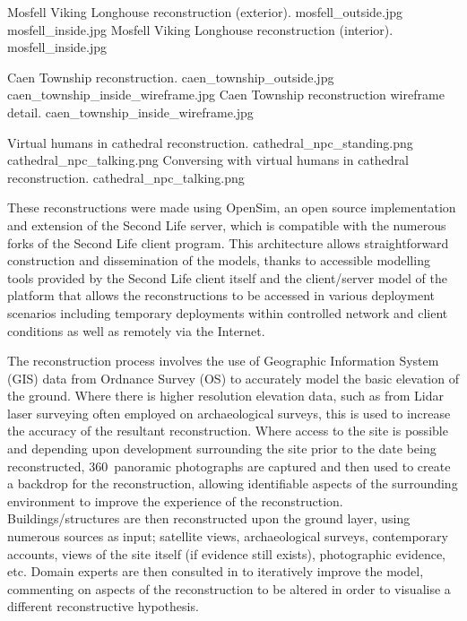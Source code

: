  {Mosfell Viking Longhouse reconstruction (exterior).} {mosfell_outside.jpg}
	   {mosfell_inside.jpg} {Mosfell Viking Longhouse reconstruction (interior).} {mosfell_inside.jpg}

 {Caen Township reconstruction.} {caen_township_outside.jpg}
       {caen_township_inside_wireframe.jpg} {Caen Township reconstruction wireframe detail.} {caen_township_inside_wireframe.jpg}

 {Virtual humans in cathedral reconstruction.} {cathedral_npc_standing.png}
       {cathedral_npc_talking.png} {Conversing with virtual humans in cathedral reconstruction.} {cathedral_npc_talking.png}

These reconstructions were made using OpenSim, an open source implementation and extension of the Second Life server, which is compatible with the numerous forks of the Second Life client program. This architecture allows straightforward construction and dissemination of the models, thanks to accessible modelling tools provided by the Second Life client itself and the client/server model of the platform that allows the reconstructions to be accessed in various deployment scenarios including temporary deployments within controlled network and client conditions as well as remotely via the Internet.

The reconstruction process involves the use of Geographic Information System (GIS) data from Ordnance Survey (OS) to accurately model the basic elevation of the ground. Where there is higher resolution elevation data, such as from Lidar laser surveying often employed on archaeological surveys, this is used to increase the accuracy of the resultant reconstruction. Where access to the site is possible and depending upon development surrounding the site prior to the date being reconstructed, 360\textdegree\ panoramic photographs are captured and then used to create a backdrop for the reconstruction, allowing identifiable aspects of the surrounding environment to improve the experience of the reconstruction. Buildings/structures are then reconstructed upon the ground layer, using numerous sources as input; satellite views, archaeological surveys, contemporary accounts, views of the site itself (if evidence still exists), photographic evidence, etc. Domain experts are then consulted in to iteratively improve the model, commenting on aspects of the reconstruction to be altered in order to visualise a different reconstructive hypothesis.

